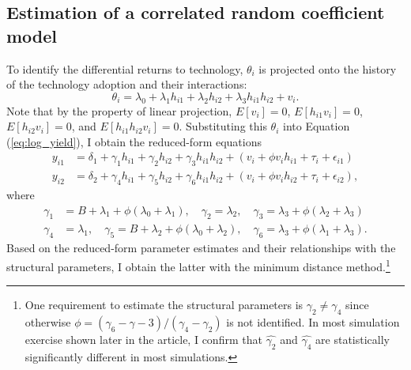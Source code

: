 \documentclass[11pt,letterpaper]{article}
\begin{document}
\subsection{Estimation of a correlated random coefficient model}

To identify the differential returns to technology, $\theta_i$ is projected onto the history of the technology adoption and their interactions:
\begin{equation}\label{eq:linear_projection}
  \theta_i = \lambda_0 + \lambda_1 h_{i1} + \lambda_2 h_{i2} + \lambda_3 h_{i1} h_{i2} + v_i.
\end{equation}
Note that by the property of linear projection, $E[v_i] = 0$, $E[h_{i1} v_i] = 0$, $E[h_{i2} v_i] = 0$, and $E[h_{i1} h_{i2} v_i] = 0$.
Substituting this $\theta_i$ into Equation (\ref{eq:log_yield}), I obtain the reduced-form equations
\begin{align*}
  y_{i1} &= \delta_1 + \gamma_1 h_{i1} + \gamma_2 h_{i2} + \gamma_3 h_{i1} h_{i2} + (v_i + \phi v_i h_{i1} + \tau_i + \epsilon_{i1}) \\
  y_{i2} &= \delta_2 + \gamma_4 h_{i1} + \gamma_5 h_{i2} + \gamma_6 h_{i1} h_{i2} + (v_i + \phi v_i h_{i2} + \tau_i + \epsilon_{i2}),
\end{align*}
where
\begin{align*}
  \gamma_1 &= B + \lambda_1 + \phi (\lambda_0 + \lambda_1), \quad \gamma_2 = \lambda_2, \quad \gamma_3 = \lambda_3 + \phi (\lambda_2 + \lambda_3) \\
  \gamma_4 &= \lambda_1, \quad  \gamma_5 = B + \lambda_2 + \phi (\lambda_0 + \lambda_2), \quad \gamma_6 = \lambda_3 + \phi (\lambda_1 + \lambda_3).
\end{align*}
Based on the reduced-form parameter estimates and their relationships with the structural parameters, I obtain the latter with the minimum distance method.\footnote{
  One requirement to estimate the structural parameters is $\gamma_2 \ne \gamma_4$ since otherwise $\phi = (\gamma_6 - \gamma-3) / (\gamma_4 - \gamma_2)$ is not identified.
  In most simulation exercise shown later in the article, I confirm that $\widehat{\gamma_2}$ and $\widehat{\gamma_4}$ are statistically significantly different in most simulations.
}
\end{document}
